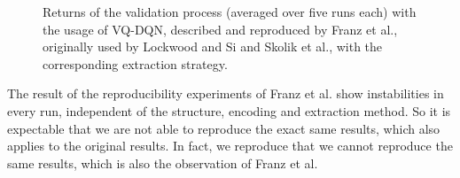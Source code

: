 \begin{figure*}[tb]
\centering
	\scalebox{.62}{}
	\caption{Returns of the validation process (averaged over five runs each) with the usage of \ac{VQ-DQN}, described and reproduced by Franz et al.\autocite{instabilities}, originally used by Lockwood and Si\autocite{lockwood} and Skolik et al.\autocite{skolik}, with the corresponding extraction strategy.}
\label{results}
\end{figure*}

The result of the reproducibility experiments of Franz et al. show instabilities in every run, independent of the structure, encoding and extraction method. 
So it is expectable that we are not able to reproduce the exact same results, which also applies to the original results.
In fact, we reproduce that we cannot reproduce the same results, which is also the observation of Franz et al. 

